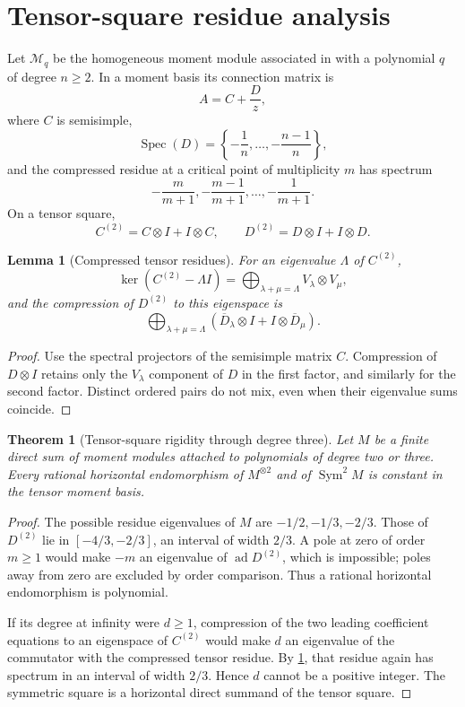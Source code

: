 \documentclass[11pt]{article}
\numberwithin{equation}{section}
\newtheorem{theorem}{Theorem}[section]
\newtheorem{lemma}[lemma]{Lemma}
\theoremstyle{definition}
\theoremstyle{remark}
\newcommand{\Spec}{\operatorname{Spec}}
\newcommand{\Sym}{\operatorname{Sym}}
\newcommand{\Mcal}{\mathcal M}
\begin{document}
\section{Tensor-square residue analysis}
\label{sec:tensor}

Let $\Mcal_q$ be the homogeneous moment module associated in
\cite{LongEIT} with a polynomial $q$ of degree $n\ge2$.  In a moment basis its
connection matrix is
\[
  A=C+\frac Dz,
\]
where $C$ is semisimple,
\[
  \Spec(D)=\left\{-\frac1n,\ldots,-\frac{n-1}{n}\right\},
\]
and the compressed residue at a critical point of multiplicity $m$ has
spectrum
\[
  -\frac m{m+1},-\frac{m-1}{m+1},\ldots,-\frac1{m+1}.
\]
On a tensor square,
\[
  C^{(2)}=C\otimes I+I\otimes C,
  \qquad
  D^{(2)}=D\otimes I+I\otimes D.
\]

\begin{lemma}[Compressed tensor residues]
\label{lem:tensor-compression}
For an eigenvalue $\Lambda$ of $C^{(2)}$,
\[
  \ker(C^{(2)}-\Lambda I)
  =\bigoplus_{\lambda+\mu=\Lambda}V_\lambda\otimes V_\mu,
\]
and the compression of $D^{(2)}$ to this eigenspace is
\[
  \bigoplus_{\lambda+\mu=\Lambda}
  \left(\overline D_\lambda\otimes I
        +I\otimes\overline D_\mu\right).
\]
\end{lemma}

\begin{proof}
Use the spectral projectors of the semisimple matrix $C$.  Compression of
$D\otimes I$ retains only the $V_\lambda$ component of $D$ in the first
factor, and similarly for the second factor.  Distinct ordered pairs do not
mix, even when their eigenvalue sums coincide.
\end{proof}

\begin{theorem}[Tensor-square rigidity through degree three]
\label{thm:degree23}
Let $M$ be a finite direct sum of moment modules attached to polynomials of
degree two or three.  Every rational horizontal endomorphism of
$M^{\otimes2}$ and of $\Sym^2M$ is constant in the tensor moment basis.
\end{theorem}

\begin{proof}
The possible residue eigenvalues of $M$ are
$-1/2,-1/3,-2/3$.  Those of $D^{(2)}$ lie in
$[-4/3,-2/3]$, an interval of width $2/3$.  A pole at zero of order
$m\ge1$ would make $-m$ an eigenvalue of $\operatorname{ad}D^{(2)}$, which
is impossible; poles away from zero are excluded by order comparison.
Thus a rational horizontal endomorphism is polynomial.

If its degree at infinity were $d\ge1$, compression of the two leading
coefficient equations to an eigenspace of $C^{(2)}$ would make $d$ an
eigenvalue of the commutator with the compressed tensor residue.  By
\cref{lem:tensor-compression}, that residue again has spectrum in an
interval of width $2/3$.  Hence $d$ cannot be a positive integer.  The
symmetric square is a horizontal direct summand of the tensor square.
\end{proof}
\end{document}
